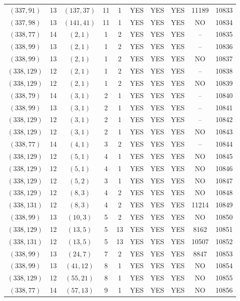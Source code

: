 \begin{longtable}{|c|c|c|c|c|c|c|c|c|c|}
$(337, 91)$ & 13 & $(137, 37)$ & 11 & 1 & YES & YES & YES & 11189 & 10833\\
$(337, 98)$ & 13 & $(141, 41)$ & 11 & 1 & YES & YES & YES & NO & 10834\\
$(338, 77)$ & 14 & $(2, 1)$ & 1 & 2 & YES & YES & YES & -- & 10835\\
$(338, 99)$ & 13 & $(2, 1)$ & 1 & 2 & YES & YES & YES & -- & 10836\\
$(338, 99)$ & 13 & $(2, 1)$ & 1 & 2 & YES & YES & YES & NO & 10837\\
$(338, 129)$ & 12 & $(2, 1)$ & 1 & 2 & YES & YES & YES & -- & 10838\\
$(338, 129)$ & 12 & $(2, 1)$ & 1 & 2 & YES & YES & YES & NO & 10839\\
$(338, 79)$ & 14 & $(3, 1)$ & 2 & 1 & YES & YES & YES & -- & 10840\\
$(338, 99)$ & 13 & $(3, 1)$ & 2 & 1 & YES & YES & YES & -- & 10841\\
$(338, 129)$ & 12 & $(3, 1)$ & 2 & 1 & YES & YES & YES & -- & 10842\\
$(338, 129)$ & 12 & $(3, 1)$ & 2 & 1 & YES & YES & YES & NO & 10843\\
$(338, 77)$ & 14 & $(4, 1)$ & 3 & 2 & YES & YES & YES & -- & 10844\\
$(338, 129)$ & 12 & $(5, 1)$ & 4 & 1 & YES & YES & YES & NO & 10845\\
$(338, 129)$ & 12 & $(5, 1)$ & 4 & 1 & YES & YES & YES & NO & 10846\\
$(338, 129)$ & 12 & $(5, 2)$ & 3 & 1 & YES & YES & YES & NO & 10847\\
$(338, 129)$ & 12 & $(8, 3)$ & 4 & 2 & YES & YES & YES & NO & 10848\\
$(338, 131)$ & 12 & $(8, 3)$ & 4 & 2 & YES & YES & YES & 11214 & 10849\\
$(338, 99)$ & 13 & $(10, 3)$ & 5 & 2 & YES & YES & YES & NO & 10850\\
$(338, 129)$ & 12 & $(13, 5)$ & 5 & 13 & YES & YES & YES & 8162 & 10851\\
$(338, 131)$ & 12 & $(13, 5)$ & 5 & 13 & YES & YES & YES & 10507 & 10852\\
$(338, 99)$ & 13 & $(24, 7)$ & 7 & 2 & YES & YES & YES & 8847 & 10853\\
$(338, 99)$ & 13 & $(41, 12)$ & 8 & 1 & YES & YES & YES & NO & 10854\\
$(338, 129)$ & 12 & $(55, 21)$ & 8 & 1 & YES & YES & YES & NO & 10855\\
$(338, 77)$ & 14 & $(57, 13)$ & 9 & 1 & YES & YES & YES & NO & 10856\\

\end{longtable}

